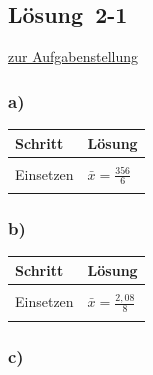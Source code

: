 \documentclass[
  11pt,
  ngerman,
  a4paper,
]{report}
\begin{document}
\hypertarget{loesung-2-1}{%
\subsection{Lösung~2-1}\label{loesung-2-1}}

\protect\hyperlink{aufgabe-2-1}{zur Aufgabenstellung}

\hypertarget{a-2}{%
\subsubsection{a)}\label{a-2}}

\begin{table}[H]
\centering
\begin{tabular}{l>{\raggedright\arraybackslash}p{8cm}}
\toprule
\textbf{Schritt} & \textbf{Lösung}\\
\midrule
\cellcolor{gray!6}{Formel} & \cellcolor{gray!6}{$\bar{x}=\frac{\sum\limits_{i=1}^{n}x_{i}}{n}$}\\
Einsetzen & $\bar{x}=\frac{356}{6}$\\
\cellcolor{gray!6}{Ergebnis} & \cellcolor{gray!6}{$\bar{x}=59{,}33$}\\
\bottomrule
\end{tabular}
\end{table}

\hypertarget{b-2}{%
\subsubsection{b)}\label{b-2}}

\begin{table}[H]
\centering
\begin{tabular}{l>{\raggedright\arraybackslash}p{8cm}}
\toprule
\textbf{Schritt} & \textbf{Lösung}\\
\midrule
\cellcolor{gray!6}{Formel} & \cellcolor{gray!6}{$\bar{x}=\frac{\sum\limits_{i=1}^{n}x_{i}}{n}$}\\
Einsetzen & $\bar{x}=\frac{2{,}08}{8}$\\
\cellcolor{gray!6}{Ergebnis} & \cellcolor{gray!6}{$\bar{x}=0{,}26$}\\
\bottomrule
\end{tabular}
\end{table}

\hypertarget{c-2}{%
\subsubsection{c)}\label{c-2}}
\end{document}

